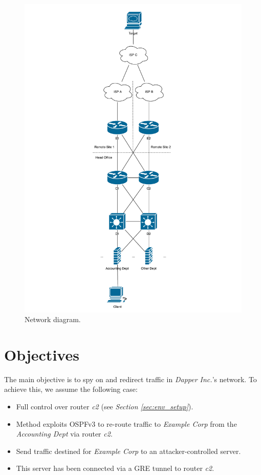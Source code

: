 \documentclass[11pt,a4paper,oneside]{article}
\newcommand{\lsection}[2]{\section{#1}\label{sec:#2}}
\begin{document}
    \begin{figure}[htb]
        \centering
        \includegraphics[height=\textheight]{netdiagram.pdf}
        \caption{Network diagram.}
        \label{netdiagram}
    \end{figure}


    \lsection{Objectives}{objectives}
    The main objective is to spy on and redirect traffic in \textit{Dapper Inc.}'s network.
    To achieve this, we assume the following case:
    \begin{itemize}
        \item Full control over router \textit{c2} (see \textit{Section \ref{sec:env_setup}}).
        \item Method exploits OSPFv3 to re-route traffic to \textit{Example Corp} from the \textit{Accounting Dept} via router \textit{c2}.
        \item Send traffic destined for \textit{Example Corp} to an attacker-controlled server.
        \item This server has been connected via a GRE tunnel to router \textit{c2}.
    \end{itemize}
\end{document}

